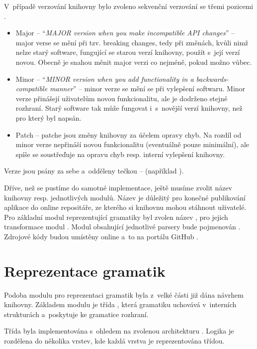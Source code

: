 		V~případě verzování knihovny bylo zvoleno sekvenční verzování se třemi pozicemi \cite{semver}.
		\begin{itemize}
			\item Major -- \enquote{\textit{MAJOR version when you make incompatible API changes}} \cite{semver} -- major verse se mění při tzv. breaking changes, tedy při změnách, kvůli nimž nelze starý software, fungující se starou verzí knihovny, použít s~její verzí novou. Obecně je snahou měnit major verzi co nejméně, pokud možno vůbec. 
			\item Minor -- \enquote{\textit{MINOR version when you add functionality in a backwards-compatible manner}} \cite{semver} -- minor verze se mění se při vylepšení softwaru. Minor verze přinášejí uživatelům novou funkcionalitu, ale je dodrženo stejné rozhraní. Starý software tak může fungovat i~s~novější verzí knihov\-ny, než pro který byl napsán.
			\item Patch -- patche jsou změny knihovny za účelem opravy chyb. Na rozdíl od minor verze nepřináší novou funkcionalitu (eventuálně pouze minimální), ale spíše se soustřeďuje na opravu chyb resp. interní vylepšení knihovny.
		\end{itemize}
		Verze jsou psány za sebe a~odděleny tečkou --  (například ).
		
		Dříve, než se pustíme do samotné implementace, ještě musíme zvolit název knihovny resp. jednotlivých modulů. Název je důležitý pro konečné publikování aplikace do online repositáře, ze kterého si knihovnu mohou stáhnout uživatelé. Pro základní modul reprezentující gramatiky byl zvolen název , pro jejich transformace modul . Modul obsahující jednotlivé parsery bude pojmenován . Zdrojové kódy budou umístěny online a~to na portálu GitHub \cite{GrammpyProject}.
		
	\section{Reprezentace gramatik}
	
		Podoba modulu pro reprezentaci gramatik byla z~velké části již dána návrhem knihovny. Základem modulu je třída , která gramatiku uchovává v~interních strukturách a~poskytuje ke gramatice rozhraní.
		
		Třída  byla implementována s~ohledem na zvolenou architekturu . Logika je rozdělena do několika vrstev, kde každá vrstva je reprezentována třídou.
		
